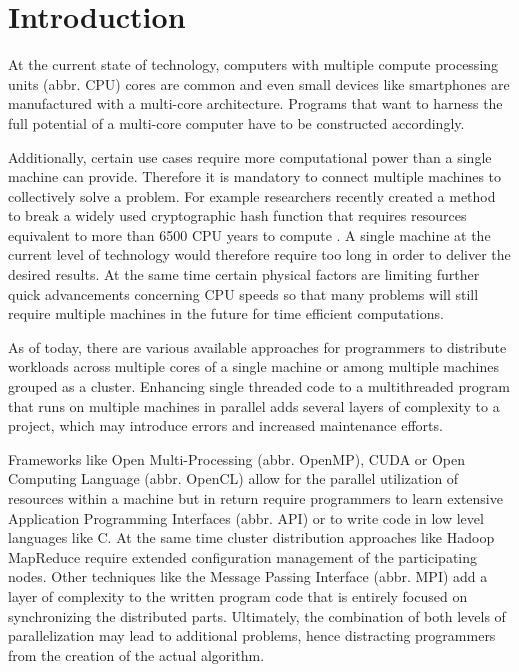 \chapter{Introduction}
\label{intro}
At the current state of technology, computers with multiple compute processing units (abbr. CPU) cores are common and even small devices like smartphones are manufactured with a multi-core architecture\cite{arm_big_little}. Programs that want to harness the full potential of a multi-core computer have to be constructed accordingly.

Additionally, certain use cases require more computational power than a single machine can provide. Therefore it is mandatory to connect multiple machines to collectively solve a problem. For example researchers recently created a method to break a widely used cryptographic hash function that requires resources equivalent to more than 6500 CPU years to compute \cite{shattered}. A single machine at the current level of technology would therefore require too long in order to deliver the desired results. At the same time certain physical factors are limiting further quick advancements concerning CPU speeds \cite{end_of_moores_law}\cite{end_of_silicon} so that many problems will still require multiple machines in the future for time efficient computations.

As of today, there are various available approaches for programmers to distribute workloads across multiple cores of a single machine or among multiple machines grouped as a cluster. Enhancing single threaded code to a multithreaded program that runs on multiple machines in parallel adds several layers of complexity to a project, which may introduce errors and increased maintenance efforts.

Frameworks like Open Multi-Processing (abbr. OpenMP), CUDA or Open Computing Language (abbr. OpenCL) allow for the parallel utilization of resources within a machine but in return require programmers to learn extensive Application Programming Interfaces (abbr. API) or to write code in low level languages like C.
At the same time cluster distribution approaches like Hadoop MapReduce require extended configuration management of the participating nodes. Other techniques like the Message Passing Interface (abbr. MPI) add a layer of complexity to the written program code that is entirely focused on synchronizing the distributed parts.
Ultimately, the combination of both levels of parallelization may lead to additional problems, hence distracting programmers from the creation of the actual algorithm.

